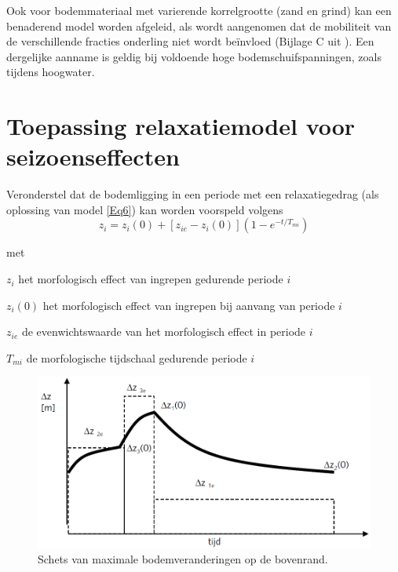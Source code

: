 Ook voor bodemmateriaal met varierende korrelgrootte (zand en grind) kan een benaderend model worden afgeleid, als wordt aangenomen dat de mobiliteit van de verschillende fracties onderling niet wordt be\"invloed (Bijlage C uit \citet{Waterdienst2008}).
Een dergelijke aanname is geldig bij voldoende hoge bodemschuifspanningen, zoals tijdens hoogwater.

\section{Toepassing relaxatiemodel voor seizoenseffecten}

Veronderstel dat de bodemligging in een periode met een relaxatiegedrag (als oplossing van model \autoref{Eq6}) kan worden voorspeld volgens
%
\begin{equation}
z_i = z_i (0) + [z_{ie} - z_i(0)](1 - e^{-t/T_{mi}})
\label{Eq7}
\end{equation}

met

\begin{symbollist}
\item[$z_i$]  het morfologisch effect van ingrepen gedurende periode $i$
\item[$z_i(0)$]  het morfologisch effect van ingrepen bij aanvang van periode $i$
\item[$z_{ie}$]  de evenwichtswaarde van het morfologisch effect in periode $i$
\item[$T_{mi}$]  de morfologische tijdschaal gedurende periode $i$
\end{symbollist}

\begin{figure}
\includegraphics[width=\columnwidth]{figures/Fig5.png}
\caption{Schets van maximale bodemveranderingen op de bovenrand.}
\label{Fig5}
\end{figure}

